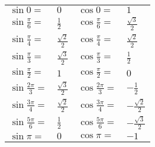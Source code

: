 \documentclass[10pt,letterpaper]{article}
\begin{document}
\begin{center}\begin{minipage}[center]{400pt}\begin{minipage}[left]{200pt}

\end{minipage}
\begin{minipage}[right]{180pt}
\begin{tabular}{llll}
$\sin 0 =$ & $0$							&$\cos 0 =$ & $1$										\\
$\sin\frac{\pi}{6} =$ & $\frac{1}{2}$		&$\cos \frac{\pi}{6} =$ & $\frac{\sqrt{3}}{2}$			\\
$\sin\frac{\pi}{4} =$ & $\frac{\sqrt{2}}{2}$
											&$\cos \frac{\pi}{4} =$ & $\frac{\sqrt{2}}{2}$			\\
$\sin\frac{\pi}{3} =$ & $\frac{\sqrt{3}}{2}$
											&$\cos \frac{\pi}{3} =$ & $\frac{1}{2}$					\\
$\sin\frac{\pi}{2} =$ & $1$					&$\cos \frac{\pi}{2} =$ & $0$							\\
$\sin\frac{2\pi}{3} =$ & $\frac{\sqrt{3}}{2}$
											&$\cos \frac{2\pi}{3} =$ & $-\frac{1}{2}$				\\
$\sin\frac{3\pi}{4} =$ & $\frac{\sqrt{2}}{2}$
											&$\cos \frac{3\pi}{4} =$ & $-\frac{\sqrt{2}}{2}$		\\
$\sin\frac{5\pi}{6} =$ & $\frac{1}{2}$		&$\cos \frac{5\pi}{6} =$ & $-\frac{\sqrt{3}}{2}$		\\
$\sin\pi =$ & $0$							&$\cos\pi =$ & $-1$										\\
\end{tabular}
\end{minipage}\end{minipage}\end{center}
\end{document}
